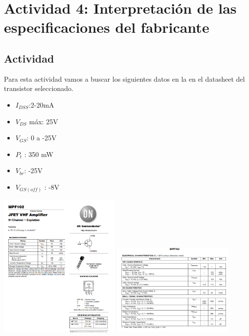 
\newpage
\section{Actividad 4: Interpretación de las especificaciones del fabricante}

\subsection{Actividad}

Para esta actividad vamos a buscar los siguientes datos en la en el datasheet del transistor seleccionado.

\begin{itemize}
    \item $I_{DSS}$:2-20mA
    \item $V_{DS}$ máx: 25V
    \item $V_{GS}$: 0 a -25V
    \item $P_{t}$ : 350 mW
    \item $V_{br}$: -25V
    \item $V_{GS(off)}$ : -8V
\end{itemize}

\includegraphics[width=6cm]{./imagenes/Datasheet.png}
\includegraphics[width=6cm]{./imagenes/Datasheet2.png}